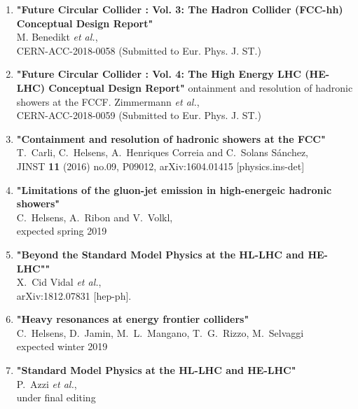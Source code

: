 \documentclass[12pt]{article}
\begin{document}
\begin{enumerate}
\item
{\bf "Future Circular Collider : Vol. 3: The Hadron Collider (FCC-hh) Conceptual Design Report"}
\\{}M. Benedikt {\it et al.},
\\{}CERN-ACC-2018-0058 (Submitted to Eur. Phys. J. ST.)

\item
{\bf "Future Circular Collider : Vol. 4: The High Energy LHC (HE-LHC) Conceptual Design Report"}
ontainment and resolution of hadronic showers at the FCCF. Zimmermann  {\it et al.},
\\{}CERN-ACC-2018-0059 (Submitted to Eur. Phys. J. ST.)

\item
{\bf "Containment and resolution of hadronic showers at the FCC"}
\\{} T.~Carli, C.~Helsens, A.~Henriques Correia and C.~Solans S\'anchez,
\\{} JINST {\bf 11} (2016) no.09,  P09012, arXiv:1604.01415 [physics.ins-det]
 
\item
{\bf "Limitations of the gluon-jet emission in high-energeic hadronic showers"}
\\{} C.~Helsens, A.~Ribon and V.~Volkl,
\\{} expected spring 2019

\item
{\bf "Beyond the Standard Model Physics at the HL-LHC and HE-LHC""}
\\{}  X.~Cid Vidal  {\it et al.},
\\{}  arXiv:1812.07831 [hep-ph].

\item
{\bf "Heavy resonances at energy frontier colliders"}
\\{} C.~Helsens, D.~Jamin, M.~L.~Mangano, T.~G.~Rizzo, M.~Selvaggi
\\{} expected winter 2019

\item
{\bf "Standard Model Physics at the HL-LHC and HE-LHC"}
\\{} P.~Azzi {\it et al.},
\\{} under final editing


\end{enumerate}
\end{document}
